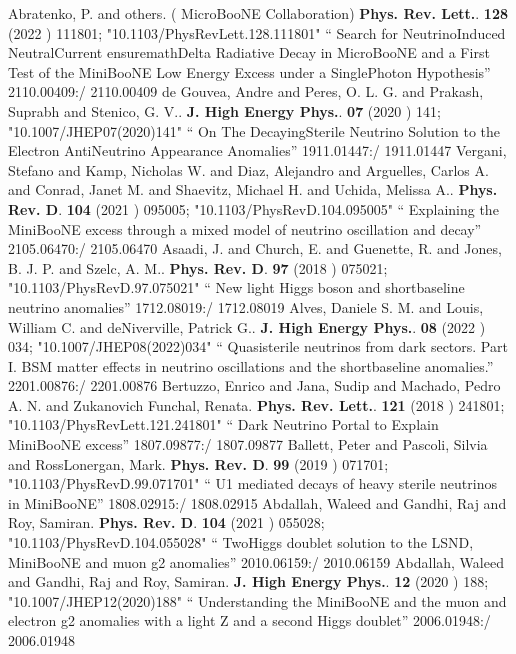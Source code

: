 \documentclass{article}
\begin{document}
\begin{thebibliography}{99}
  Abratenko, P. and others. ( MicroBooNE Collaboration) {\bf  Phys. Rev. Lett.}. {\bf  128} (2022 )  111801;  "10.1103/PhysRevLett.128.111801" `` Search for NeutrinoInduced NeutralCurrent ensuremathDelta Radiative Decay in MicroBooNE and a First Test of the MiniBooNE Low Energy Excess under a SinglePhoton Hypothesis'' 2110.00409:/ 2110.00409
  de Gouvea, Andre and Peres, O. L. G. and Prakash, Suprabh and Stenico, G. V.. {\bf  J. High Energy Phys.}. {\bf  07} (2020 )  141;  "10.1007/JHEP07(2020)141" `` On The DecayingSterile Neutrino Solution to the Electron AntiNeutrino Appearance Anomalies'' 1911.01447:/ 1911.01447
  Vergani, Stefano and Kamp, Nicholas W. and Diaz, Alejandro and Arguelles, Carlos A. and Conrad, Janet M. and Shaevitz, Michael H. and Uchida, Melissa A.. {\bf  Phys. Rev. D}. {\bf  104} (2021 )  095005;  "10.1103/PhysRevD.104.095005" `` Explaining the MiniBooNE excess through a mixed model of neutrino oscillation and decay'' 2105.06470:/ 2105.06470
  Asaadi, J. and Church, E. and Guenette, R. and Jones, B. J. P. and Szelc, A. M.. {\bf  Phys. Rev. D}. {\bf  97} (2018 )  075021;  "10.1103/PhysRevD.97.075021" `` New light Higgs boson and shortbaseline neutrino anomalies'' 1712.08019:/ 1712.08019
  Alves, Daniele S. M. and Louis, William C. and deNiverville, Patrick G.. {\bf  J. High Energy Phys.}. {\bf  08} (2022 )  034;  "10.1007/JHEP08(2022)034" `` Quasisterile neutrinos from dark sectors. Part I. BSM matter effects in neutrino oscillations and the shortbaseline anomalies.'' 2201.00876:/ 2201.00876
  Bertuzzo, Enrico and Jana, Sudip and Machado, Pedro A. N. and Zukanovich Funchal, Renata. {\bf  Phys. Rev. Lett.}. {\bf  121} (2018 )  241801;  "10.1103/PhysRevLett.121.241801" `` Dark Neutrino Portal to Explain MiniBooNE excess'' 1807.09877:/ 1807.09877
  Ballett, Peter and Pascoli, Silvia and RossLonergan, Mark. {\bf  Phys. Rev. D}. {\bf  99} (2019 )  071701;  "10.1103/PhysRevD.99.071701" `` U1 mediated decays of heavy sterile neutrinos in MiniBooNE'' 1808.02915:/ 1808.02915
  Abdallah, Waleed and Gandhi, Raj and Roy, Samiran. {\bf  Phys. Rev. D}. {\bf  104} (2021 )  055028;  "10.1103/PhysRevD.104.055028" `` TwoHiggs doublet solution to the LSND, MiniBooNE and muon g2 anomalies'' 2010.06159:/ 2010.06159
  Abdallah, Waleed and Gandhi, Raj and Roy, Samiran. {\bf  J. High Energy Phys.}. {\bf  12} (2020 )  188;  "10.1007/JHEP12(2020)188" `` Understanding the MiniBooNE and the muon and electron g2 anomalies with a light Z and a second Higgs doublet'' 2006.01948:/ 2006.01948

\end{thebibliography}
\end{document}
